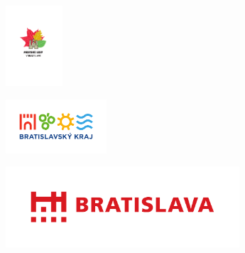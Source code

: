 \documentclass[a4paper,12pt]{article}
\begin{document}
\begin{figure}
\centering
\begin{subfigure}{0.30\textwidth}
\centering
\includegraphics[height=3cm]{logo_lesyBA.pdf}
\label{fig:left}
\end{subfigure}
\begin{subfigure}{0.30\textwidth}
\centering
\includegraphics[height=2cm]{logo_BSK.pdf}
\label{fig:center}
\end{subfigure}
\begin{subfigure}{0.30\textwidth}
\centering
\includegraphics[height=3cm]{logo_BA.pdf}
\label{fig:right}
\end{subfigure}
\label{fig:combined}
\end{figure}
\end{document}

